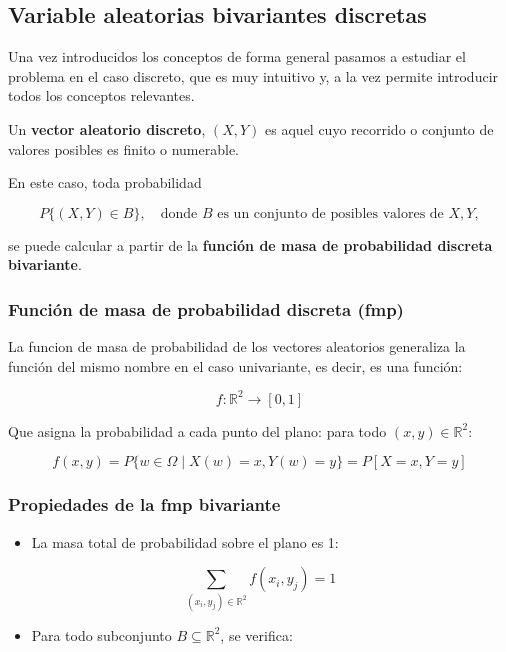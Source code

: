 \documentclass[
]{article}
\providecommand{\tightlist}{%
  \setlength{\itemsep}{0pt}\setlength{\parskip}{0pt}}
\begin{document}
\subsection{Variable aleatorias bivariantes discretas}\label{variable-aleatorias-bivariantes-discretas}

Una vez introducidos los conceptos de forma general pasamos a estudiar el problema en el caso discreto, que es muy intuitivo y, a la vez permite introducir todos los conceptos relevantes.

Un \textbf{vector aleatorio discreto}, \((X, Y)\) es aquel cuyo recorrido o conjunto de valores posibles es finito o numerable.

En este caso, toda probabilidad

\[
P\{(X, Y) \in B\}, \quad \text{donde } B \text{ es un conjunto de posibles valores de } X, Y,
\]

se puede calcular a partir de la \textbf{función de masa de probabilidad discreta bivariante}.

\subsubsection{Función de masa de probabilidad discreta (fmp)}\label{funciuxf3n-de-masa-de-probabilidad-discreta-fmp}

La funcion de masa de probabilidad de los vectores aleatorios generaliza la función del mismo nombre en el caso univariante, es decir, es una función:

\[
f: \mathbb{R}^2 \to [0, 1]
\]

Que asigna la probabilidad a cada punto del plano: para todo \((x, y) \in \mathbb{R}^{2}\):

\[
f(x, y) = P\{w \in \Omega \mid X(w) = x, Y(w) = y\} = P[X = x, Y = y]
\]

\subsubsection{Propiedades de la fmp bivariante}\label{propiedades-de-la-fmp-bivariante}

\begin{itemize}
\tightlist
\item
  La masa total de probabilidad sobre el plano es 1:
\end{itemize}

\[
\sum_{(x_i, y_j) \in \mathbb{R}^{2}} f(x_i, y_j) = 1
\]

\begin{itemize}
\tightlist
\item
  Para todo subconjunto \(B \subseteq \mathbb{R}^2\), se verifica:
\end{itemize}
\end{document}
